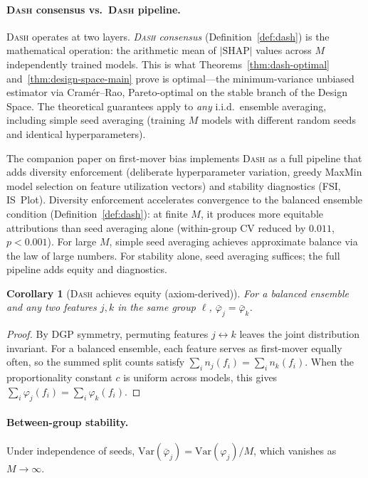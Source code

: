 \documentclass{article}
\newtheorem{corollary}[theorem]{Corollary}
\newcommand{\Var}{\mathrm{Var}}
\newcommand{\DASH}{\textsc{Dash}}
\begin{document}
\paragraph{\DASH{} consensus vs.\ \DASH{} pipeline.}
\DASH{} operates at two layers. \emph{\DASH{} consensus} (Definition~\ref{def:dash}) is the mathematical operation: the arithmetic mean of $|\text{SHAP}|$ values across $M$ independently trained models. This is what Theorems~\ref{thm:dash-optimal} and~\ref{thm:design-space-main} prove is optimal---the minimum-variance unbiased estimator via Cram\'er--Rao, Pareto-optimal on the stable branch of the Design Space. The theoretical guarantees apply to \emph{any} i.i.d.\ ensemble averaging, including simple seed averaging (training $M$ models with different random seeds and identical hyperparameters).

The companion paper on first-mover bias implements \DASH{} as a full pipeline that adds diversity enforcement (deliberate hyperparameter variation, greedy MaxMin model selection on feature utilization vectors) and stability diagnostics (FSI, IS~Plot). Diversity enforcement accelerates convergence to the balanced ensemble condition (Definition~\ref{def:dash}): at finite $M$, it produces more equitable attributions than seed averaging alone (within-group CV reduced by $0.011$, $p < 0.001$). For large $M$, simple seed averaging achieves approximate balance via the law of large numbers. For stability alone, seed averaging suffices; the full pipeline adds equity and diagnostics.

\begin{corollary}[\DASH{} achieves equity (axiom-derived)]
\label{cor:equity}
For a balanced ensemble and any two features $j, k$ in the same group $\ell$, $\bar{\varphi}_j = \bar{\varphi}_k$.
\end{corollary}

\begin{proof}
By DGP symmetry, permuting features $j \leftrightarrow k$ leaves the joint distribution invariant. For a balanced ensemble, each feature serves as first-mover equally often, so the summed split counts satisfy $\sum_i n_j(f_i) = \sum_i n_k(f_i)$. When the proportionality constant $c$ is uniform across models, this gives $\sum_i \varphi_j(f_i) = \sum_i \varphi_k(f_i)$.
\end{proof}

\paragraph{Between-group stability.}
Under independence of seeds, $\Var(\bar{\varphi}_j) = \Var(\varphi_j) / M$, which vanishes as $M \to \infty$.
\end{document}
